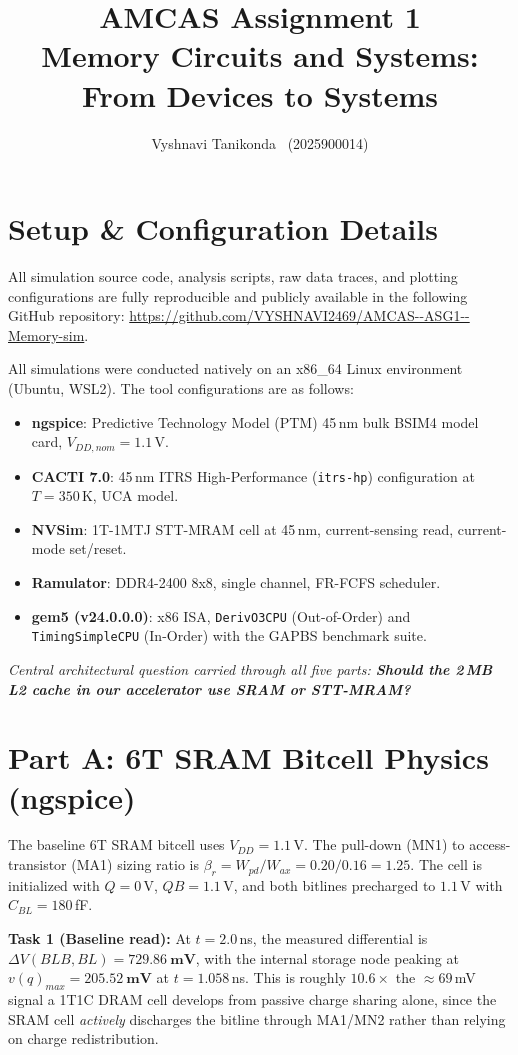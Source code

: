\documentclass[11pt]{article}
\title{\vspace{-1.5em}AMCAS Assignment 1\\[0.3em]\large Memory Circuits and Systems: From Devices to Systems}
\author{Vyshnavi Tanikonda \, (2025900014)}
\date{}
\begin{document}
\maketitle
\vspace{-2em}

\section*{Setup \& Configuration Details}
All simulation source code, analysis scripts, raw data traces, and plotting configurations are fully reproducible and publicly available in the following GitHub repository: \url{https://github.com/VYSHNAVI2469/AMCAS--ASG1--Memory-sim}.

All simulations were conducted natively on an x86\_64 Linux environment (Ubuntu, WSL2). The tool configurations are as follows:
\begin{itemize}
    \item \textbf{ngspice}: Predictive Technology Model (PTM) 45\,nm bulk BSIM4 model card, $V_{DD,nom}=1.1$\,V.
    \item \textbf{CACTI 7.0}: 45\,nm ITRS High-Performance (\texttt{itrs-hp}) configuration at $T=350$\,K, UCA model.
    \item \textbf{NVSim}: 1T-1MTJ STT-MRAM cell at 45\,nm, current-sensing read, current-mode set/reset.
    \item \textbf{Ramulator}: DDR4-2400 8x8, single channel, FR-FCFS scheduler.
    \item \textbf{gem5 (v24.0.0.0)}: x86 ISA, \texttt{DerivO3CPU} (Out-of-Order) and \texttt{TimingSimpleCPU} (In-Order) with the GAPBS benchmark suite.
\end{itemize}

\textit{Central architectural question carried through all five parts: \textbf{Should the 2\,MB L2 cache in our accelerator use SRAM or STT-MRAM?}}

\section{Part A: 6T SRAM Bitcell Physics (ngspice)}
The baseline 6T SRAM bitcell uses $V_{DD}=1.1$\,V. The pull-down (MN1) to access-transistor (MA1) sizing ratio is $\beta_r = W_{pd}/W_{ax} = 0.20/0.16 = 1.25$. The cell is initialized with $Q=0$\,V, $QB=1.1$\,V, and both bitlines precharged to $1.1$\,V with $C_{BL}=180$\,fF.

\textbf{Task 1 (Baseline read):} At $t=2.0$\,ns, the measured differential is $\Delta V(BLB,BL) = \mathbf{729.86\ mV}$, with the internal storage node peaking at $v(q)_{max}=\mathbf{205.52\ mV}$ at $t=1.058$\,ns. This is roughly $10.6\times$ the $\approx69$\,mV signal a 1T1C DRAM cell develops from passive charge sharing alone, since the SRAM cell \emph{actively} discharges the bitline through MA1/MN2 rather than relying on charge redistribution.
\end{document}
